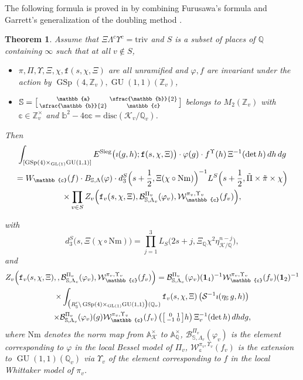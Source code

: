\documentclass[JEP,XML,SOM,Unicode,published]{cedram}
\newenvironment{smallbmatrix}{\big[\begin{smallmatrix}}{\end{smallmatrix}\big]}
\theoremstyle{plain}
\newtheorem{thm}{Theorem}[subsection]
\theoremstyle{remark}
\let\mr\mathrm
\newcommand{\bA}{\mathbb{A}}
\newcommand{\bQ}{\mathbb{Q}}
\newcommand{\bS}{\mathbb{S}}
\newcommand{\bZ}{\mathbb{Z}}
\newcommand{\bba}{\mathbb{a}}
\newcommand{\bbb}{\mathbb{b}}
\newcommand{\bbc}{\mathbb{c}}
\newcommand{\cB}{\mathcal{B}}
\newcommand{\cK}{\mathcal{K}}
\newcommand{\cS}{\mathcal{S}}
\newcommand{\cW}{\mathcal{W}}
\DeclareMathOperator{\GL}{GL}
\DeclareMathOperator{\GSp}{GSp}
\DeclareMathOperator{\GU}{GU}
\newcommand{\Nm}{\mathrm{Nm}}
\newcommand{\triv}{\mathrm{triv}}
\newcommand{\Sieg}{\mr{Sieg}}
\let\mf f
\let\Bes\cB
\let\bes B
\let\Whi\cW
\let\whi W
\newcommand{\bid}{\mathbf{1}}
\newcommand{\dsec}{{\texttt f}}
\begin{document}
The following formula is proved in \cite[Th.\,2.1.1]{pFL} by combining Furusawa's formula \cite{Furusawa} and Garrett's generalization of the doubling method \cite{GaKl}.
\begin{thm}\label{thm:Furusawa}
Assume that $\Xi\Lambda^c\Upsilon^c=\triv$ and $S$ is a subset of places of $\bQ$ containing $\infty$ such that at all $v\notin S$,
\begin{itemize}
\item
$\pi,\Pi,\Upsilon,\Xi,\chi,\dsec(s,\chi,\Xi)$ are all unramified and $\varphi, f$ are invariant under the action by $\GSp(4,\bZ_v),\GU(1,1)(\bZ_v)$,
\item
$\bS=\begin{smallbmatrix}\bba&\sfrac{\bbb}{2}\\\sfrac{\bbb}{2}&\bbc\end{smallbmatrix}$ belongs to $M_2(\bZ_v)$ with $\bbc\in\bZ^\times_v$ and $\bbb^2-4\bba\bbc=\mr{disc}(\cK_v/\bQ_v)$.
\end{itemize}
\begin{minipage}{\textwidth}
Then
\begin{multline*}
\int_{[\GSp(4)\times_{\GL(1)}\GU(1,1)]} E^{\Sieg}\bigl(\imath(g,h);\dsec(s,\chi,\Xi)\bigr)\cdot \varphi(g) \cdot \mf^\Upsilon(h)\,\Xi^{-1}(\det h) \,dh\,dg\\
=\whi_\bbc(f)\cdot \bes_{\bS,\Lambda}(\varphi)\cdot d^S_3\Bigl(s+\frac{1}{2},\Xi(\chi\circ\Nm)\Bigr)^{-1}L^S\Bigl(s+\frac{1}{2},\tilde{\Pi}\times\tilde{\pi}\times\chi\Bigr)\\
\times \prod_{v\in S} Z_v\Bigl(\dsec_v(s,\chi,\Xi),\Bes^{\Pi_v}_{\bS,\Lambda_v}(\varphi_v), \Whi^{\pi_v,\Upsilon_v}_\bbc(f_v)\Bigr),
\end{multline*}
\end{minipage}
with
\[
d^S_3\bigl(s,\Xi(\chi\circ\Nm)\bigr)=\prod_{j=1}^3 L_S\bigl(2s+j,\Xi_\bQ\chi^2\eta^{n-j}_{\cK/\bQ}\bigr),
\]
and
\begin{multline*}
Z_v\Bigl(\dsec_v(s,\chi,\Xi),,\Bes^{\Pi_v}_{\bS,\Lambda_v}(\varphi_v), \Whi^{\pi_v,\Upsilon_v}_\bbc(f_v)\Bigr)
=\Bes^{\Pi_v}_{\bS,\Lambda_v}(\varphi_v)(\bid_4)^{-1}\Whi^{\pi_v,\Upsilon_v}_\bbc(f_v)(\bid_2)^{-1}\\
\times \int_{\bigl(R'_\bS\backslash\GSp(4)\times_{\GL(1)}\GU(1,1)\bigr)(\bQ_v)} \dsec_v(s,\chi,\Xi)\left(\cS^{-1}\imath(\eta_\bS\, g,h)\right)\\
\times \Bes^{\Pi_v}_{\bS,\Lambda_v}(\varphi_v)(g)
\Whi^{\pi_v,\Upsilon_v}_\bbc(f_v)\left(\begin{smallbmatrix}0&1\\-1&0\end{smallbmatrix}h\right)\Xi^{-1}_v(\det h)\,dhdg,
\end{multline*}
where $\Nm$ denotes the norm map from $\bA^\times_\cK$ to $\bA^\times_\bQ$, $\Bes^{\Pi_v}_{\bS,\Lambda_v}(\varphi_v)$ is the element corresponding to $\varphi$ in the local Bessel model of $\Pi_v$, $\Whi^{\pi_v,\Upsilon_v}_\bbc(f_v)$ is the extension to $\GU(1,1)(\bQ_v)$ via $\Upsilon_v$ of the element corresponding to $f$ in the local Whittaker model of $\pi_v$.
\end{thm}
\end{document}
